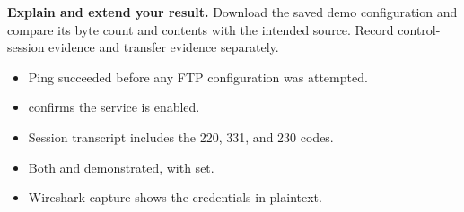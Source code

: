 \begin{verification}
\textbf{Explain and extend your result.} Download the saved demo configuration and compare its byte count and contents with the intended source. Record control-session evidence and transfer evidence separately.


\begin{itemize}
  \item Ping succeeded before any FTP configuration was attempted.
  \item {} confirms the service is enabled.
  \item Session transcript includes the 220, 331, and 230 codes.
  \item Both  and  demonstrated, with  set.
  \item Wireshark capture shows the credentials in plaintext.
\end{itemize}
\end{verification}
